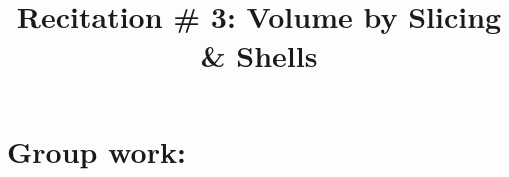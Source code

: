 \documentclass[handout,instructornotes]{ximera}
\title{Recitation \# 3: Volume by Slicing \& Shells}
\begin{document}
\begin{abstract}		\end{abstract}
\maketitle

\section{Group work:}
\end{document}
